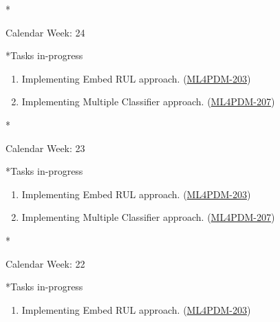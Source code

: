 \documentclass[11pt,a4paper]{article}
\begin{document}
\newpage
\begin{section}*{Calendar Week: 24 \hfill \date{18 June, 2021}}
 \begin{refsection}
   \begin{subsection}*{Tasks in-progress}
     \begin{enumerate}
       \item
             Implementing Embed RUL approach. (\href{https://ml4pdm.atlassian.net/browse/ML4PDM-203}{ML4PDM-203})
       \item
             Implementing Multiple Classifier approach. (\href{https://ml4pdm.atlassian.net/browse/ML4PDM-207}{ML4PDM-207})
     \end{enumerate}
   \end{subsection}
 \end{refsection}
\end{section}

\newpage
\begin{section}*{Calendar Week: 23 \hfill \date{11 June, 2021}}
 \begin{refsection}
   \begin{subsection}*{Tasks in-progress}
     \begin{enumerate}
       \item
             Implementing Embed RUL approach. (\href{https://ml4pdm.atlassian.net/browse/ML4PDM-203}{ML4PDM-203})
       \item
             Implementing Multiple Classifier approach. (\href{https://ml4pdm.atlassian.net/browse/ML4PDM-207}{ML4PDM-207})
     \end{enumerate}
   \end{subsection}
 \end{refsection}
\end{section}

\newpage
\begin{section}*{Calendar Week: 22 \hfill \date{04 June, 2021}}
 \begin{refsection}
   \begin{subsection}*{Tasks in-progress}
     \begin{enumerate}
       \item
             Implementing Embed RUL approach. (\href{https://ml4pdm.atlassian.net/browse/ML4PDM-203}{ML4PDM-203})
     \end{enumerate}
   \end{subsection}
 \end{refsection}
\end{section}
\end{document}
